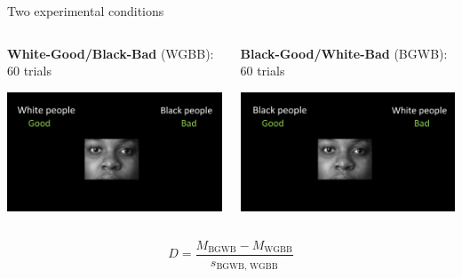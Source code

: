 \documentclass[compress]{beamer}
\begin{document}
\begin{frame}

\begin{block}{Two experimental conditions}
	\begin{columns}[T]
		\begin{column}{.50\linewidth}
			\begin{center}
				\textbf{White-Good/Black-Bad} (WGBB): 60 trials
			\end{center}
			
			\centering \includegraphics[width=\linewidth]{img/wgbb.png}
		\end{column}
		
		\begin{column}{.50\linewidth}
			\begin{center}
				\textbf{Black-Good/White-Bad} (BGWB):   60 trials
			\end{center}
			
			\centering \includegraphics[width=\linewidth]{img/bgwb.png}
		\end{column}
	\end{columns}
\end{block}

\begin{equation*}
	D = \dfrac{M_{\text{BGWB}}-M_{\text{WGBB}}}{s_{\text{BGWB, WGBB}}}
\end{equation*}

\end{frame}
\end{document}
